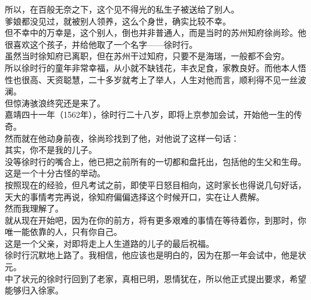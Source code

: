 \begin{multicols}{\theparacolNo}
所以，在百般无奈之下，这个见不得光的私生子被送给了别人。\\

爹娘都没见过，就被别人领养，这么个身世，确实比较不幸。\\

但不幸中的万幸是，这个别人，倒也并非普通人，而是当时的苏州知府徐尚珍。他很喜欢这个孩子，并给他取了一个名字——徐时行。\\

虽然当时徐知府已离职，但在苏州干过知府，只要不是海瑞，一般都不会穷。\\

所以徐时行的童年非常幸福，从小就不缺钱花，丰衣足食，家教良好。而他本人悟性也很高、天资聪慧，二十多岁就考上了举人，人生对他而言，顺利得不见一丝波澜。\\

但惊涛骇浪终究还是来了。\\

嘉靖四十一年（1562年），徐时行二十八岁，即将上京参加会试，开始他一生的传奇。\\

然而就在他动身前夜，徐尚珍找到了他，对他说了这样一句话：\\

其实，你不是我的儿子。\\

没等徐时行的嘴合上，他已把之前所有的一切都和盘托出，包括他的生父和生母。\\

这是一个十分古怪的举动。\\

按照现在的经验，但凡考试之前，即使平日怒目相向，这时家长也得说几句好话，天大的事情考完再说，徐知府偏偏选择这个时候开口，实在让人费解。\\

然而我理解了。\\

就从现在开始吧，因为在你的前方，将有更多艰难的事情在等待着你，到那时，你唯一能依靠的人，只有你自己。\\

这是一个父亲，对即将走上人生道路的儿子的最后祝福。\\

徐时行沉默地上路了。我相信，他应该也是明白的，因为在那一年会试中，他是状元。\\

中了状元的徐时行回到了老家，真相已明，恩情犹在，所以他正式提出要求，希望能够归入徐家。\\


\end{multicols}
